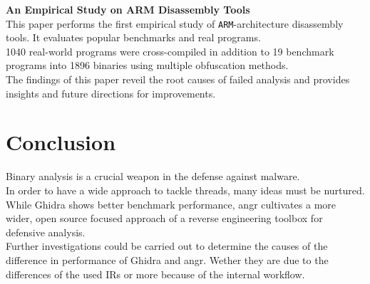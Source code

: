 \documentclass[seminar]{plai}
\begin{document}
\noindent\textbf{An Empirical Study on ARM Disassembly Tools}\\
This paper performs the first empirical study of \texttt{ARM}-architecture disassembly tools. It evaluates popular benchmarks and real programs.\\
1040 real-world programs were cross-compiled in addition to 19 benchmark programs into 1896 binaries using multiple obfuscation methods.\\
The findings of this paper reveil the root causes of failed analysis and provides insights and future directions for improvements.\cite{an-empirical-study-on-ARM-disassembly-disassembly-tools} 

\section{Conclusion}
\label{sec:conclusion}
Binary analysis is a crucial weapon in the defense against malware.\\
In order to have a wide approach to tackle threads, many ideas must be nurtured.\\
While Ghidra shows better benchmark performance, angr cultivates a more wider, open source focused approach of a reverse engineering toolbox for defensive analysis.\\
Further investigations could be carried out to determine the causes of the difference in performance of Ghidra and angr. Wether they are due to the differences of the used IRs or more because of the internal workflow.



\end{document}

